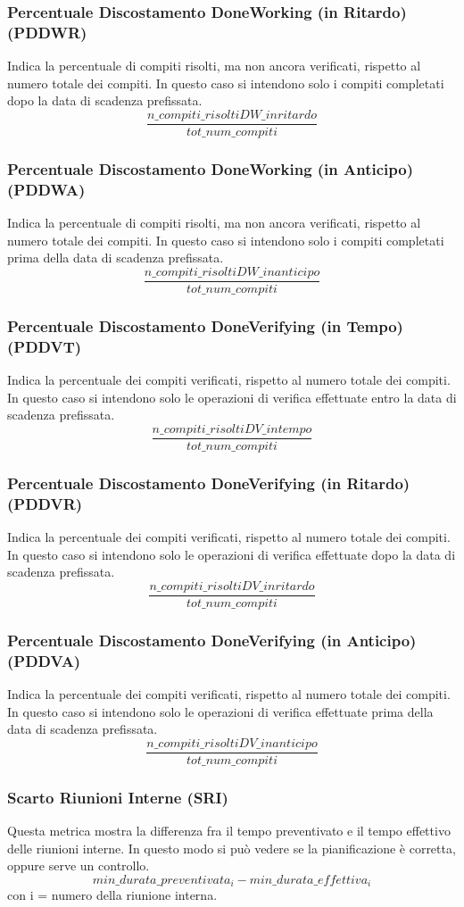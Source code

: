 \subsubsection{Percentuale Discostamento DoneWorking (in Ritardo) (PDDWR)}
Indica la percentuale di compiti risolti, ma non ancora verificati, rispetto al numero totale dei compiti. In questo caso si intendono solo i compiti completati dopo la data di scadenza prefissata.
\[\frac{n\_compiti\_risoltiDW\_inritardo}{tot\_num\_compiti}\]
\subsubsection{Percentuale Discostamento DoneWorking (in Anticipo) (PDDWA)}
Indica la percentuale di compiti risolti, ma non ancora verificati, rispetto al numero totale dei compiti. In questo caso si intendono solo i compiti completati prima della data di scadenza prefissata.
\[\frac{n\_compiti\_risoltiDW\_inanticipo}{tot\_num\_compiti}\]
\subsubsection{Percentuale Discostamento DoneVerifying (in Tempo) (PDDVT)}
Indica la percentuale dei compiti verificati, rispetto al numero totale dei compiti. In questo caso si intendono solo le operazioni di verifica effettuate entro la data di scadenza prefissata.
\[\frac{n\_compiti\_risoltiDV\_intempo}{tot\_num\_compiti}\]

\subsubsection{Percentuale Discostamento DoneVerifying (in Ritardo) (PDDVR)}
Indica la percentuale dei compiti verificati, rispetto al numero totale dei compiti. In questo caso si intendono solo le operazioni di verifica effettuate dopo la data di scadenza prefissata.
\[\frac{n\_compiti\_risoltiDV\_inritardo}{tot\_num\_compiti}\]
\subsubsection{Percentuale Discostamento DoneVerifying (in Anticipo) (PDDVA)}
Indica la percentuale dei compiti verificati, rispetto al numero totale dei compiti. In questo caso si intendono solo le operazioni di verifica effettuate prima della data di scadenza prefissata.
\[\frac{n\_compiti\_risoltiDV\_inanticipo}{tot\_num\_compiti}\]
\subsubsection{Scarto Riunioni Interne (SRI)}
Questa metrica mostra la differenza fra il tempo preventivato e il tempo effettivo delle riunioni interne. In questo modo si può vedere se la pianificazione è corretta, oppure serve un controllo.
\[min\_durata\_preventivata_i-min\_durata\_effettiva_i\] 
con i = numero della riunione interna.
